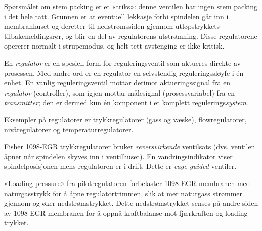 





Spørsmålet om stem packing er et «triks»: denne ventilen har ingen stem packing i det hele tatt. Grunnen er at eventuell lekkasje forbi spindelen går inn i membranhuset og deretter til nedstrømssiden gjennom utløpstrykkets tilbakemeldingsrør, og blir en del av regulatorens utstrømning. Disse regulatorene opererer normalt i strupemodus, og helt tett avstenging er ikke kritisk.







En {\it regulator} er en spesiell form for reguleringsventil som aktueres direkte av prosessen. Med andre ord er en regulator en selvstendig reguleringssløyfe i én enhet. En vanlig reguleringsventil mottar derimot aktueringssignal fra en {\it regulator} (controller), som igjen mottar målesignal (prosessvariabel) fra en {\it transmitter}; den er dermed kun én komponent i et komplett regulerings{\it system}.

Eksempler på regulatorer er trykkregulatorer (gass og væske), flowregulatorer, nivåregulatorer og temperaturregulatorer.

\vskip 10pt

Fisher 1098-EGR trykkregulatorer bruker {\it reversvirkende} ventilsats (dvs. ventilen åpner når spindelen skyves inn i ventilhuset). En vandringsindikator viser spindelposisjonen mens regulatoren er i drift. Dette er {\it cage-guided}-ventiler.

\vskip 10pt

«Loading pressure» fra pilotregulatoren forbelaster 1098-EGR-membranen med naturgasstrykk for å åpne regulatortrimmen, slik at mer naturgass strømmer gjennom og øker nedstrømstrykket. Dette nedstrømstrykket senses på andre siden av 1098-EGR-membranen for å oppnå kraftbalanse mot fjærkraften og loading-trykket.




